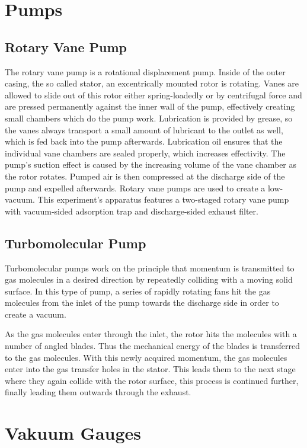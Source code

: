 
\section{Pumps}
\subsection{Rotary Vane Pump}
The rotary vane pump is a rotational displacement pump.
Inside of the outer casing, the so called stator, an excentrically mounted rotor is rotating.
Vanes are allowed to slide out of this rotor either spring-loadedly or by centrifugal force and are pressed permanently against the inner wall of the pump, effectively creating small chambers which do the pump work.
Lubrication is provided by grease, so the vanes always transport a small amount of lubricant to the outlet as well, which is fed back into the pump afterwards.
Lubrication oil ensures that the individual vane chambers are sealed properly, which increases effectivity.
The pump's suction effect is caused by the increasing volume of the vane chamber as the rotor rotates.
Pumped air is then compressed at the discharge side of the pump and expelled afterwards.
Rotary vane pumps are used to create a low-vacuum.
This experiment's apparatus features a two-staged rotary vane pump with vacuum-sided adsorption trap and discharge-sided exhaust filter.

\subsection{Turbomolecular Pump}
Turbomolecular pumps work on the principle that momentum is transmitted to gas molecules in a desired direction by repeatedly colliding with a moving solid surface.
In this type of pump, a series of rapidly rotating fans hit the gas molecules from the inlet of the pump towards the discharge side in order to create a vacuum.

As the gas molecules enter through the inlet, the rotor hits the molecules with a number of angled blades.
Thus the mechanical energy of the blades is transferred to the gas molecules.
With this newly acquired momentum, the gas molecules enter into the gas transfer holes in the stator.
This leads them to the next stage where they again collide with the rotor surface, this process is continued further, finally leading them outwards through the exhaust.

\section{Vakuum Gauges}
